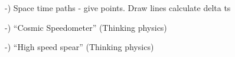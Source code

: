 

-) Space time paths
   -  give points. Draw lines calculate delta ts


   


   -) ``Cosmic Speedometer'' (Thinking physics)

   -) ``High speed spear'' (Thinking physics)

   
